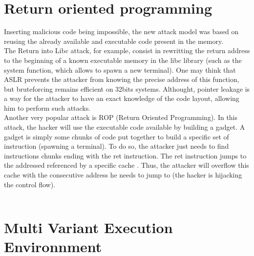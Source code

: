 \documentclass[english]{enstaPRE}
\begin{document}
\section{Return oriented programming}
Inserting malicious code being impossible, the new attack model was based on reusing the already available and executable code present
in the memory. \\ The Return into Libc attack, for example, consist in rewritting the return address to the beginning of a known
executable memory in the libc library (such as the system function, which allows to spawn a new terminal). One may think that ASLR
prevents the attacker from knowing the precise address of this function, but bruteforcing remains efficient on 32bits systems.
Althought, pointer leakage is a way for the attacker to have an exact knowledge of the code layout, allowing him to perform such attacks.
\\
Another very popular attack is ROP (Return Oriented Programming). In this attack, the hacker will use the executable code available 
by building a gadget. A gadget is simply some chunks of code put together to build a specific set of instruction (spawning a terminal).
To do so, the attacker just needs to find instructions chunks ending with the ret instruction. The ret instruction jumps to the addressed
referenced by a specific cache \cite{warInMemory}. Thus, the attacker will overflow this cache with the consecutive address he needs to jump to 
(the hacker is hijacking the control flow).
\\ \\

\section{Multi Variant Execution Environnment}
\end{document}
